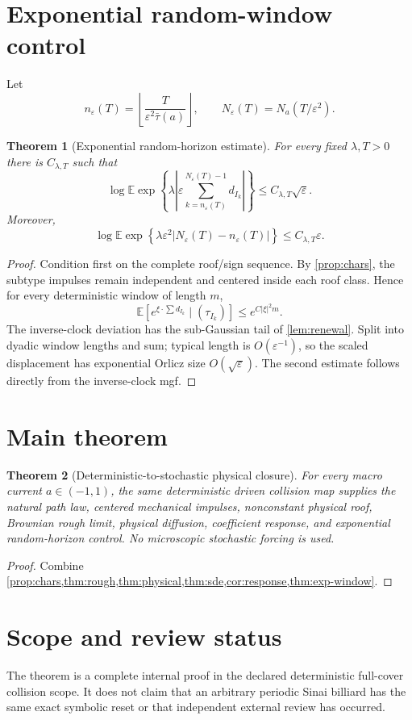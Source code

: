 \documentclass[11pt,reqno]{amsart}
\newtheorem{theorem}{Theorem}[section]
\theoremstyle{remark}
\newcommand{\E}{\mathbb E}
\newcommand{\abs}[1]{\left\lvert #1\right\rvert}
\begin{document}
\section{Exponential random-window control}
Let
\[
 n_\varepsilon(T)=\left\lfloor
 \frac{T}{\varepsilon^2\bar\tau(a)}\right\rfloor,
 \qquad N_\varepsilon(T)=N_a(T/\varepsilon^2).
\]

\begin{theorem}[Exponential random-horizon estimate]\label{thm:exp-window}
For every fixed $\lambda,T>0$ there is $C_{\lambda,T}$ such that
\[
 \log\E\exp\left
 \{\lambda\abs{
 \varepsilon\sum_{k=n_\varepsilon(T)}^{N_\varepsilon(T)-1}d_{I_k}}
 \right\}
 \le C_{\lambda,T}\sqrt\varepsilon.
\]
Moreover,
\[
 \log\E\exp\left
 \{\lambda\varepsilon^2
 \abs{N_\varepsilon(T)-n_\varepsilon(T)}\right\}
 \le C_{\lambda,T}\varepsilon.
\]
\end{theorem}
\begin{proof}
Condition first on the complete roof/sign sequence.  By
\cref{prop:chars}, the subtype impulses remain independent and centered inside
each roof class.  Hence for every deterministic window of length $m$,
\[
 \E\left[
 e^{\xi\cdot\sum d_{I_k}}\mid(\tau_{I_k})
 \right]\le e^{C\abs\xi^2m}.
\]
The inverse-clock deviation has the sub-Gaussian tail of
\cref{lem:renewal}.  Split into dyadic window lengths and sum; typical length
is $O(\varepsilon^{-1})$, so the scaled displacement has exponential Orlicz
size $O(\sqrt\varepsilon)$.  The second estimate follows directly from the
inverse-clock mgf.
\end{proof}

\section{Main theorem}
\begin{theorem}[Deterministic-to-stochastic physical closure]\label{thm:main}
For every macro current $a\in(-1,1)$, the same deterministic driven collision
map supplies the natural path law, centered mechanical impulses, nonconstant
physical roof, Brownian rough limit, physical diffusion, coefficient response,
and exponential random-horizon control.  No microscopic stochastic forcing is
used.
\end{theorem}
\begin{proof}
Combine \cref{prop:chars,thm:rough,thm:physical,thm:sde,cor:response,thm:exp-window}.
\end{proof}

\section*{Scope and review status}
The theorem is a complete internal proof in the declared deterministic
full-cover collision scope.  It does not claim that an arbitrary periodic
Sinai billiard has the same exact symbolic reset or that independent external
review has occurred.



\end{document}
